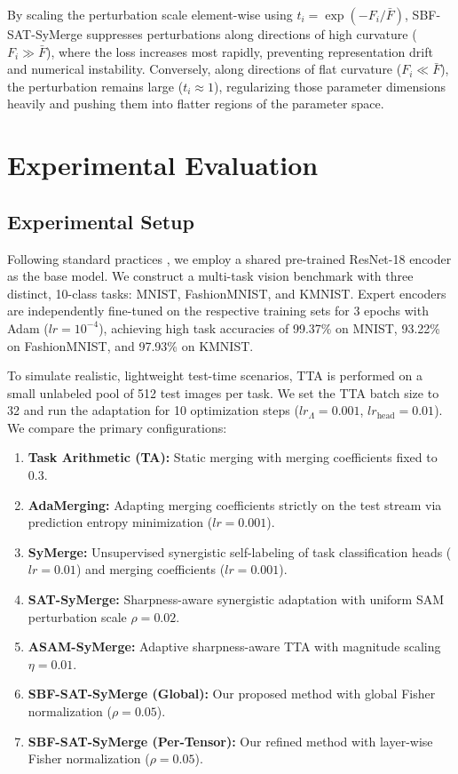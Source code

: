 \documentclass{article}
\theoremstyle{plain}
\theoremstyle{definition}
\theoremstyle{remark}
\begin{document}
By scaling the perturbation scale element-wise using $t_i = \exp(-F_i / \bar{F})$, SBF-SAT-SyMerge suppresses perturbations along directions of high curvature ($F_i \gg \bar{F}$), where the loss increases most rapidly, preventing representation drift and numerical instability. Conversely, along directions of flat curvature ($F_i \ll \bar{F}$), the perturbation remains large ($t_i \approx 1$), regularizing those parameter dimensions heavily and pushing them into flatter regions of the parameter space.

\section{Experimental Evaluation}
\label{sec:experiments}

\subsection{Experimental Setup}
Following standard practices \cite{submission1}, we employ a shared pre-trained ResNet-18 encoder as the base model. We construct a multi-task vision benchmark with three distinct, 10-class tasks: MNIST, FashionMNIST, and KMNIST. Expert encoders are independently fine-tuned on the respective training sets for 3 epochs with Adam ($lr=10^{-4}$), achieving high task accuracies of 99.37\% on MNIST, 93.22\% on FashionMNIST, and 97.93\% on KMNIST.

To simulate realistic, lightweight test-time scenarios, TTA is performed on a small unlabeled pool of 512 test images per task. We set the TTA batch size to 32 and run the adaptation for 10 optimization steps ($lr_{\Lambda} = 0.001$, $lr_{\text{head}} = 0.01$). We compare the primary configurations:
\begin{enumerate}
\item \textbf{Task Arithmetic (TA):} Static merging with merging coefficients fixed to 0.3.
\item \textbf{AdaMerging:} Adapting merging coefficients strictly on the test stream via prediction entropy minimization ($lr=0.001$).
\item \textbf{SyMerge:} Unsupervised synergistic self-labeling of task classification heads ($lr=0.01$) and merging coefficients ($lr=0.001$).
\item \textbf{SAT-SyMerge:} Sharpness-aware synergistic adaptation with uniform SAM perturbation scale $\rho = 0.02$.
\item \textbf{ASAM-SyMerge:} Adaptive sharpness-aware TTA with magnitude scaling $\eta = 0.01$.
\item \textbf{SBF-SAT-SyMerge (Global):} Our proposed method with global Fisher normalization ($\rho = 0.05$).
\item \textbf{SBF-SAT-SyMerge (Per-Tensor):} Our refined method with layer-wise Fisher normalization ($\rho = 0.05$).
\end{enumerate}
\end{document}
